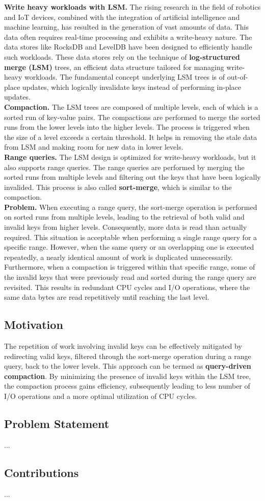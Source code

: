 \textbf{Write heavy workloads with LSM.} The rising research in the field of robotics and IoT devices, combined with the 
integration of artificial intelligence and machine learning, has resulted in the generation of vast amounts of data.
This data often requires real-time processing and exhibits a write-heavy nature. The data stores like RocksDB and 
LevelDB have been designed to efficiently handle such workloads. These data stores rely on the technique of
\textbf{log-structured merge (LSM)} trees, an efficient data structure tailored for managing write-heavy workloads. The
fundamental concept underlying LSM trees is of out-of-place updates, which logically invalidate keys instead of 
performing in-place updates.\\
\textbf{Compaction.} The LSM trees are composed of multiple levels, each of which is a sorted run of key-value pairs. 
The compactions are performed to merge the sorted runs from the lower levels into the higher levels. The process is 
triggered when the size of a level exceeds a certain threshold. It helps in removing the stale data from LSM and 
making room for new data in lower levels.\\
\textbf{Range queries.} The LSM design is optimized for write-heavy workloads, but it also supports range queries. The
range queries are performed by merging the sorted runs from multiple levels and filtering out the keys that have been
logically invalided. This process is also called \textbf{sort-merge}, which is similar to the compaction.\\
\textbf{Problem.} When executing a range query, the sort-merge operation is performed on sorted runs from multiple 
levels, leading to the retrieval of both valid and invalid keys from higher levels. Consequently, more data is read than 
actually required. This situation is acceptable when performing a single range query for a specific range. However, when 
the same query or an overlapping one is executed repeatedly, a nearly identical amount of work is duplicated 
unnecessarily. Furthermore, when a compaction is triggered within that specific range, some of the invalid keys that 
were previously read and sorted during the range query are revisited. This results in redundant CPU cycles and I/O 
operations, where the same data bytes are read repetitively until reaching the last level.


\subsection{Motivation}
The repetition of work involving invalid keys can be effectively mitigated by redirecting valid keys, filtered through 
the sort-merge operation during a range query, back to the lower levels. This approach can be termed as 
\textbf{query-driven compaction}. By minimizing the presence of invalid keys within the LSM tree, the compaction process 
gains efficiency, subsequently leading to less number of I/O operations and a more optimal utilization of CPU cycles.


\subsection{Problem Statement}
...


\subsection{Contributions}
...